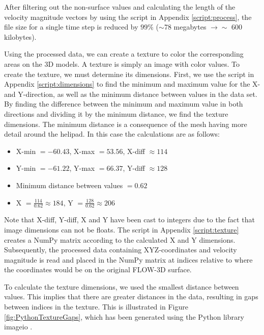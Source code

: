 \documentclass[a4paper,11pt]{extarticle}
\begin{document}
After filtering out the non-surface values and calculating the length of the velocity magnitude vectors by using the script in Appendix \ref{script:process}, the file size for a single time step is reduced by $99\%$ ($\sim$78 megabytes $\rightarrow  \sim$ 600 kilobytes).

Using the processed data, we can create a texture to color the corresponding areas on the 3D models. A texture is simply an image with color values. To create the texture, we must determine its dimensions. First, we use the script in Appendix \ref{script:dimensions} to find the minimum and maximum value for the X- and Y-direction, as well as the minimum distance between values in the data set. By finding the difference between the minimum and maximum value in both directions and dividing it by the minimum distance, we find the texture dimensions. The minimum distance is a consequence of the mesh having more detail around the helipad. In this case the calculations are as follows:

\begin{itemize}
  \item X-min $= -60.43$, X-max $=53.56$, X-diff $\approx 114$
  \item Y-min $= -61.22$, Y-max $=66.37$, Y-diff $\approx 128$
  \item Minimum distance between values $= 0.62$
  \item X $= \frac{114}{0.62} \approx 184$, Y $= \frac{128}{0.62} \approx 206$
\end{itemize}

Note that X-diff, Y-diff, X and Y have been cast to integers due to the fact that image dimensions can not be floats. The script in Appendix \ref{script:texture} creates a NumPy \citep{numpy} matrix according to the calculated X and Y dimensions. Subsequently, the processed data containing XYZ-coordinates and velocity magnitude is read and placed in the NumPy matrix at indices relative to where the coordinates would be on the original FLOW-3D surface.

To calculate the texture dimensions, we used the smallest distance between values. This implies that there are greater distances in the data, resulting in gaps between indices in the texture. This is illustrated in Figure \ref{fig:PythonTextureGaps}, which has been generated using the Python library imageio \citep{imageio}.
\end{document}
